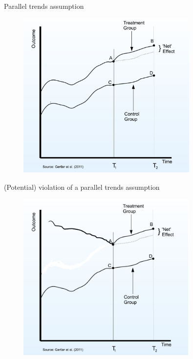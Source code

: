 \documentclass[11pt,xcolor=table]{beamer}
\begin{document}
\begin{frame}{Parallel trends assumption}

\begin{figure}
\includegraphics[width=0.8\textwidth]{figures/did1.png}
\end{figure}

\end{frame}




\begin{frame}{(Potential) violation of a parallel trends assumption}

\begin{figure}
\includegraphics[width=0.8\textwidth]{figures/did2.png}
\end{figure}

\end{frame}
\end{document}

